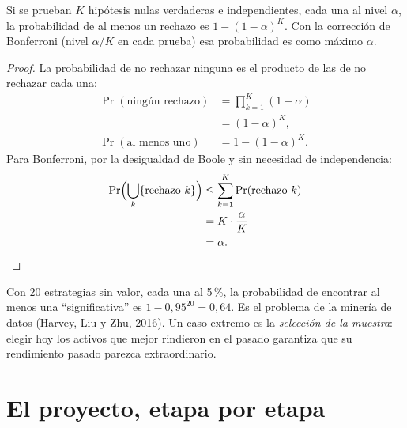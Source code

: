 \begin{proposicion}\label{prop:multiples}
Si se prueban $K$ hipótesis nulas verdaderas e independientes, cada una al nivel $\alpha$, la probabilidad de al menos un rechazo es
$1-(1-\alpha)^K$. Con la corrección de Bonferroni (nivel $\alpha/K$ en cada prueba) esa probabilidad es como máximo $\alpha$.
\end{proposicion}

\begin{proof}
La probabilidad de no rechazar ninguna es el producto de las de no rechazar cada una:
\begin{align*}
  \Pr(\text{ningún rechazo}) &= \prod_{k=1}^K(1-\alpha)\\
                             &= (1-\alpha)^K,\\
  \Pr(\text{al menos uno}) &= 1-(1-\alpha)^K .
\end{align*}
Para Bonferroni, por la desigualdad de Boole y sin necesidad de independencia:
\begin{align*}
  \Pr\Bigl(\bigcup_k\{\text{rechazo }k\}\Bigr) &\le \sum_{k=1}^K\Pr(\text{rechazo }k)\\
                                             &= K\cdot\frac{\alpha}{K}\\
                                             &= \alpha .
\end{align*}
\end{proof}

Con 20 estrategias sin valor, cada una al 5\,\%, la probabilidad de encontrar al menos una ``significativa'' es $1-0{,}95^{20}=0{,}64$. Es el
problema de la minería de datos (Harvey, Liu y Zhu, 2016). Un caso extremo es la \emph{selección de la muestra}: elegir hoy los activos que
mejor rindieron en el pasado garantiza que su rendimiento pasado parezca extraordinario.

\section{El proyecto, etapa por etapa}

